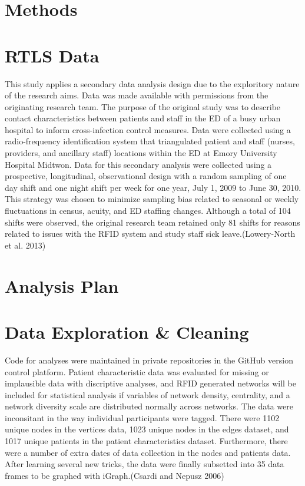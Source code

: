 \documentclass[]{elsarticle} %
\begin{document}
\section{Methods}\label{methods}

\section{RTLS Data}\label{rtls-data}

This study applies a secondary data analysis design due to the
exploritory nature of the research aims. Data was made available with
permissions from the originating research team. The purpose of the
original study was to describe contact characteristics between patients
and staff in the ED of a busy urban hospital to inform cross-infection
control measures. Data were collected using a radio-frequency
identification system that triangulated patient and staff (nurses,
providers, and ancillary staff) locations within the ED at Emory
University Hospital Midtwon. Data for this secondary analysis were
collected using a prospective, longitudinal, observational design with a
random sampling of one day shift and one night shift per week for one
year, July 1, 2009 to June 30, 2010. This strategy was chosen to
minimize sampling bias related to seasonal or weekly fluctuations in
census, acuity, and ED staffing changes. Although a total of 104 shifts
were observed, the original research team retained only 81 shifts for
reasons related to issues with the RFID system and study staff sick
leave.(Lowery-North et al. 2013)

\section{Analysis Plan}\label{analysis-plan}

\section{Data Exploration \& Cleaning}\label{data-exploration-cleaning}

Code for analyses were maintained in private repositories in the GitHub
version control platform. Patient characteristic data was evaluated for
missing or implausible data with discriptive analyses, and RFID
generated networks will be included for statistical analysis if
variables of network density, centrality, and a network diversity scale
are distributed normally across networks. The data were inconsitant in
the way individual participants were tagged. There were 1102 unique
nodes in the vertices data, 1023 unique nodes in the edges dataset, and
1017 unique patients in the patient characteristics dataset.
Furthermore, there were a number of extra dates of data collection in
the nodes and patients data. After learning several new tricks, the data
were finally subsetted into 35 data frames to be graphed with
iGraph.(Csardi and Nepusz 2006)
\end{document}
